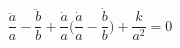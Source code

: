 \begin{equation}\label{transform}
\frac{\ddot{a}}{a}-\frac{\ddot{b}}{b}+\frac{\dot{a}}{a}\Bigg(\frac{\dot{a}}
{a}-\frac{\dot{b}}{b}\Bigg)+\frac{k}{a^2}=0
\end{equation}

